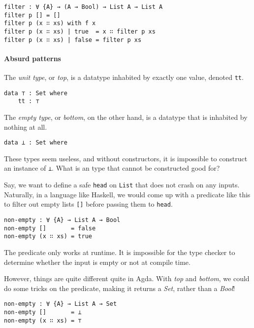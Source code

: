 \documentclass[../thesis.tex]{subfiles}
\begin{document}
\begin{lstlisting}
filter : ∀ {A} → (A → Bool) → List A → List A
filter p [] = []
filter p (x ∷ xs) with f x
filter p (x ∷ xs) | true  = x ∷ filter p xs
filter p (x ∷ xs) | false = filter p xs
\end{lstlisting}

\paragraph{Absurd patterns}

The \textit{unit type}, or \textit{top}, is a datatype inhabited by
exactly one value, denoted {\lstinline|tt|}.

\begin{lstlisting}
data ⊤ : Set where
    tt : ⊤
\end{lstlisting}

The \textit{empty type}, or \textit{bottom}, on the other hand, is a datatype
that is inhabited by nothing at all.

\begin{lstlisting}
data ⊥ : Set where
\end{lstlisting}

These types seem useless, and without constructors, it is impossible to
construct an instance of {\lstinline|⊥|}. What is an type that cannot be
constructed good for?

Say, we want to define a safe {\lstinline|head|} on {\lstinline|List|} that
does not crash on any inputs. Naturally, in a language like Haskell,
we would come up with a predicate like this to filter out empty lists
{\lstinline|[]|} before passing them to {\lstinline|head|}.

\begin{lstlisting}
non-empty : ∀ {A} → List A → Bool
non-empty []       = false
non-empty (x ∷ xs) = true
\end{lstlisting}

The predicate only works at runtime. It is impossible for the type
checker to determine whether the input is empty or not at compile time.

However, things are quite different quite in Agda. With \textit{top} and \textit{bottom},
we could do some tricks on the predicate, making it returns a \textit{Set}, rather
than a \textit{Bool}!

\begin{lstlisting}
non-empty : ∀ {A} → List A → Set
non-empty []       = ⊥
non-empty (x ∷ xs) = ⊤
\end{lstlisting}
\end{document}
